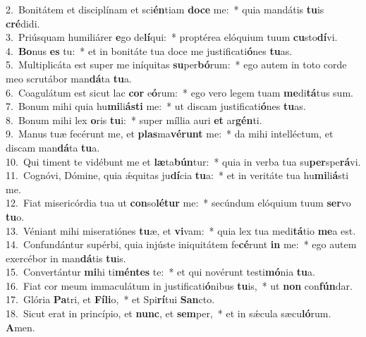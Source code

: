 {2.~}Bonitátem et disciplínam et sci\textbf{én}tiam \textbf{do}\textbf{ce} me:~* quia mandátis \textbf{tu}is \textbf{cré}didi.\\
{3.~}Priúsquam humiliárer \textbf{e}go de\textbf{lí}qui:~* proptérea elóquium tuum \textbf{cu}sto\textbf{dí}vi.\\
{4.~}\textbf{Bo}nus \textbf{es} tu:~* et in bonitáte tua doce me justificati\textbf{ó}nes \textbf{tu}as.\\
{5.~}Multiplicáta est super me iníquitas \textbf{su}per\textbf{bó}rum:~* ego autem in toto corde meo scrutábor man\textbf{dá}ta \textbf{tu}a.\\
{6.~}Coagulátum est sicut lac \textbf{cor} e\textbf{ó}rum:~* ego vero legem tuam \textbf{me}di\textbf{tá}tus sum.\\
{7.~}Bonum mihi quia hu\textbf{mi}li\textbf{á}\textbf{sti} me:~* ut discam justificati\textbf{ó}nes \textbf{tu}as.\\
{8.~}Bonum mihi lex \textbf{o}ris \textbf{tu}i:~* super míllia auri \textbf{et} ar\textbf{gén}ti.\\
{9.~}Manus tuæ fecérunt me, et \textbf{plas}ma\textbf{vé}\textbf{runt} me:~* da mihi intelléctum, et discam man\textbf{dá}ta \textbf{tu}a.\\
{10.~}Qui timent te vidébunt me et \textbf{læ}ta\textbf{bún}tur:~* quia in verba tua su\textbf{per}spe\textbf{rá}vi.\\
{11.~}Cognóvi, Dómine, quia ǽquitas ju\textbf{dí}cia \textbf{tu}a:~* et in veritáte tua hu\textbf{mi}li\textbf{á}sti me.\\
{12.~}Fiat misericórdia tua ut \textbf{con}so\textbf{lé}\textbf{tur} me:~* secúndum elóquium tuum \textbf{ser}vo \textbf{tu}o.\\
{13.~}Véniant mihi miseratiónes \textbf{tu}æ, et \textbf{vi}vam:~* quia lex tua medi\textbf{tá}tio \textbf{me}a est.\\
{14.~}Confundántur supérbi, quia injúste iniquitátem fe\textbf{cé}runt \textbf{in} me:~* ego autem exercébor in man\textbf{dá}tis \textbf{tu}is.\\
{15.~}Convertántur \textbf{mi}hi ti\textbf{mén}\textbf{tes} te:~* et qui novérunt testi\textbf{mó}nia \textbf{tu}a.\\
{16.~}Fiat cor meum immaculátum in justificati\textbf{ó}nibus \textbf{tu}is,~* ut \textbf{non} con\textbf{fún}dar.\\
{17.~}Glória \textbf{Pa}tri, et \textbf{Fí}\textbf{li}o,~* et Spi\textbf{rí}tui \textbf{San}cto.\\
{18.~}Sicut erat in princípio, et \textbf{nunc}, et \textbf{sem}per,~* et in sǽcula sæcu\textbf{ló}rum. \textbf{A}men.\\
